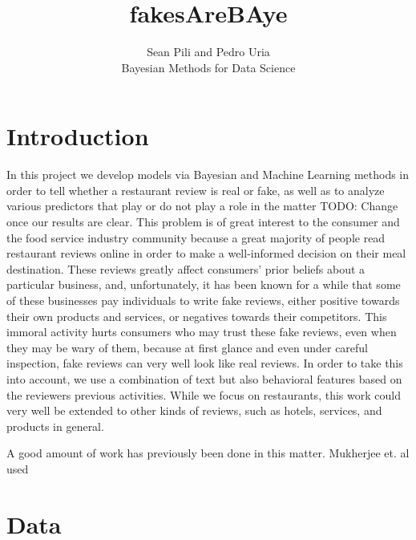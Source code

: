 \documentclass[man, floatsintext, 10pt]{apa6}
\title{fakesAreBAye}
\author{Sean Pili and Pedro Uria \\ Bayesian Methods for Data Science}
\affiliation{GWU}
\begin{document}
\maketitle

\section{Introduction}

In this project we develop models via Bayesian and Machine Learning methods in order to tell whether a restaurant review is real or fake, as well as to analyze various predictors that play or do not play a role in the matter TODO: Change once our results are clear. This problem is of great interest to the consumer and the food service industry community because a great majority of people read restaurant reviews online in order to make a well-informed decision on their meal destination. These reviews greatly affect consumers' prior beliefs about a particular business, and, unfortunately, it has been known for a while that some of these businesses pay individuals to write fake reviews, either positive towards their own products and services, or negatives towards their competitors. This immoral activity hurts consumers who may trust these fake reviews, even when they may be wary of them, because at first glance and even under careful inspection, fake reviews can very well look like real reviews. In order to take this into account, we use a combination of text but also behavioral features based on the reviewers previous activities.  While we focus on restaurants, this work could very well be extended to other kinds of reviews, such as hotels, services, and products in general.

A good amount of work has previously been done in this matter. Mukherjee et. al used 

\section{Data}
\end{document}
